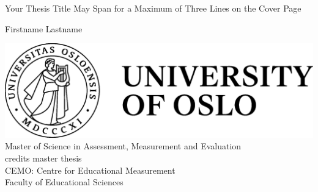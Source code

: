 \documentclass[a4paper,12pt,stu,donotrepeattitle,floatsintext,twoside]{apa7}
\title{\titlet}
\author{\authort}
\date{\semester}
\newcommand{\titlet}{Your Thesis Title May Span for a Maximum of Three Lines on the Cover Page}
\newcommand{\authort}{Firstname Lastname}
\begin{document}
\begin{titlepage}
    \thispagestyle{empty} %
    \centering %

    \vspace{5\baselineskip}

    \fontsize{24}{20pt}\selectfont
    \titlet\par
    \vspace{2.5\baselineskip}

    \fontsize{16}{12pt}\selectfont
    \authort\par
    \vspace{2.5\baselineskip}

    \hrulefill
    \vspace{2.5\baselineskip}

    \includegraphics[width=\linewidth]{01_uio_full_logo_eng_pos.eps}\\[\baselineskip]

    \fontsize{16}{16pt}\selectfont Master of Science in Assessment, Measurement and Evaluation\\
    \fontsize{16}{16pt} credits master thesis\\[1.5\baselineskip]

    \fontsize{16}{12pt}\selectfont CEMO: Centre for Educational Measurement\\
    \fontsize{16}{12pt}\selectfont Faculty of Educational Sciences\\[1.5\baselineskip]

    \fontsize{12}{12pt}\selectfont \semester\par
\end{titlepage}
\cleardoublepage
\end{document}
